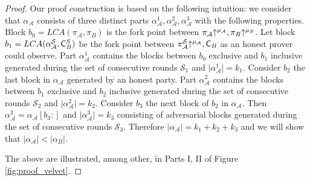 \begin{proof}
Our proof construction is based on the following intuition: we consider that $\alpha_\mathcal{A}$ consists of three distinct parts $\alpha_\mathcal{A}^1, \alpha_\mathcal{A}^2, \alpha_\mathcal{A}^3$ with the following properties.
Block $b_0 = LCA(\pi_\mathcal{A}, \pi_B)$ is the fork point between $\pi_\mathcal{A} \negthickspace\uparrow^{\mu_\mathcal{A}}, \pi_B \negthickspace\uparrow^{\mu_B}$. Let block $b_1 = LCA (\alpha^{\mathcal{S}}_\mathcal{A}, \mathsf{C}^S_B)$ be the fork point between $\pi^{\mathcal{S}}_\mathcal{A} \negthickspace\uparrow^{\mu_\mathcal{A}}, \mathsf{C}_B $ as an honest prover could observe. Part $\alpha_\mathcal{A}^1$ contains the blocks between $b_0$ exclusive and $b_1$ inclusive generated during the set of consecutive rounds $\mathcal{S}_1$ and $\lvert  \alpha_\mathcal{A}^1 \rvert = k_1$. Consider $b_2$ the last block in $\alpha_\mathcal{A}$ generated by an honest party. Part $\alpha_{\mathcal{A}}^2$ contains the blocks between $b_1$ exclusive and $b_2$ inclusive generated during the set of consecutive rounds $\mathcal{S}_2$ and $\vert  \alpha_\mathcal{A}^2 \vert = k_2$. Consider $b_3$ the next block of $b_2$ in $\alpha_\mathcal{A}$. Then $\alpha_{\mathcal{A}}^3 = \alpha_\mathcal{A}[b_3{:}]$ and $\vert  \alpha_\mathcal{A}^3 \vert = k_3$ consisting of adversarial blocks generated during the set of consecutive rounds $\mathcal{S}_3$. Therefore $\vert \alpha_\mathcal{A} \vert = k_1 + k_2 + k_3$ and we will show that $\vert \alpha_\mathcal{A} \vert < \vert \alpha_B \vert$.

The above are illustrated, among other, in Parts I, II of Figure \ref{fig:proof_velvet}.


\end{proof}
